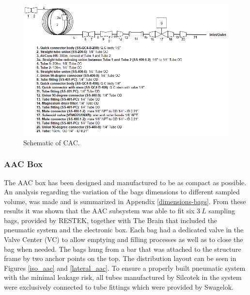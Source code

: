 \begin{landscape}
\begin{figure}[H]
    \centering
    \includegraphics[width=1.3\textwidth]{4-experiment-design/img/Mechanical/CAC-schematic.PNG}
    \caption{Schematic of CAC.}
    \label{fig:CAC-schematic}
\end{figure}
\end{landscape}
\smallskip

\pagebreak
\subsubsection{AAC Box}\label{sec:aac-analysis}
The AAC box has been designed and manufactured to be as compact as possible. An analysis regarding the variation of the bags dimensions to different sampled volume, was made and is summarized in Appendix \ref{dimensions-bags}. From these results it was shown that the AAC subsystem was able to fit six $3\ L$ sampling bags, provided by RESTEK, together with The Brain that included the pneumatic system and the electronic box. Each bag had a dedicated valve in the Valve Center (VC) to allow emptying and filling processes as well as to close the bag when needed. The bags hung from a bar that was attached to the structure frame by two anchor points on the top. The distribution layout can be seen in Figures \ref{iso_aac} and \ref{lateral_aac}. To ensure a properly built pneumatic system with the minimal leakage risk, all tubes manufactured by Silcotek in the system were exclusively connected to tube fittings which were provided by Swagelok. 
 

